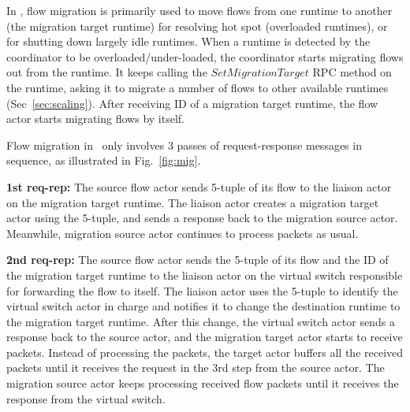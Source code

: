 In \nfactor, flow migration is primarily used to move flows from one runtime to another (the migration target runtime) for resolving hot spot (overloaded runtimes), or for shutting down largely idle runtimes. When a runtime is detected by the coordinator to be overloaded/under-loaded, the coordinator starts migrating flows out from the runtime. It keeps calling the $SetMigrationTarget$ RPC method on the runtime, asking it to migrate a number of flows to other available runtimes (Sec~\ref{sec:scaling}). %
 After receiving ID of a migration target runtime, the flow actor starts migrating flows by itself. %


Flow migration in \nfactor~only involves 3 passes of request-response messages in sequence, as illustrated in Fig.~\ref{fig:mig}.



\textbf{1st req-rep:} The source flow actor sends 5-tuple of its flow to the liaison actor on the migration target runtime. The liaison actor creates a migration target actor using the 5-tuple, and sends a response back to the migration source actor. Meanwhile, migration source actor continues to process packets as usual.

\textbf{2nd req-rep:} The source flow actor sends the 5-tuple of its flow and the ID of the migration target runtime to the liaison actor on the virtual switch responsible for forwarding the flow to itself. The liaison actor uses the 5-tuple to identify the virtual switch actor in charge and notifies it to change the destination runtime to the migration target runtime. After this change, the virtual switch actor sends a response back to the source actor, and the migration target actor starts to receive packets. Instead of processing the packets, the target actor buffers all the received packets until it receives the request in the 3rd step from the source actor. The migration source actor keeps processing received flow packets until it receives the response from the virtual switch.

